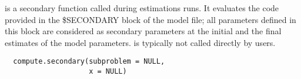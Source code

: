 %
\begin{Description}\relax
{} is a secondary function called during estimations
runs. It evaluates the code provided in the \$SECONDARY block of the model 
file; all parameters defined in this block are considered as secondary
parameters at the initial and the final estimates of the model parameters. 
 is typically not called directly by users.
\end{Description}
%
\begin{Usage}
\begin{verbatim}
  compute.secondary(subproblem = NULL,
                    x = NULL)
\end{verbatim}
\end{Usage}
%
